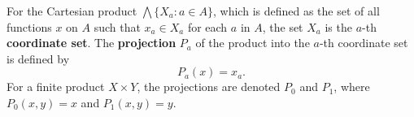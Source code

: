 For the Cartesian product $\bigwedge \{X_a : a \in A\}$, which is defined as the set of all functions $x$ on $A$ such that $x_a \in X_a$ for each $a$ in $A$, the set $X_a$ is the $a$-th \textbf{coordinate set}. The \textbf{projection} $P_a$ of the product into the $a$-th coordinate set is defined by
$$P_a(x) = x_a.$$
For a finite product $X \times Y$, the projections are denoted $P_0$ and $P_1$, where $P_0(x,y) = x$ and $P_1(x,y) = y$.
